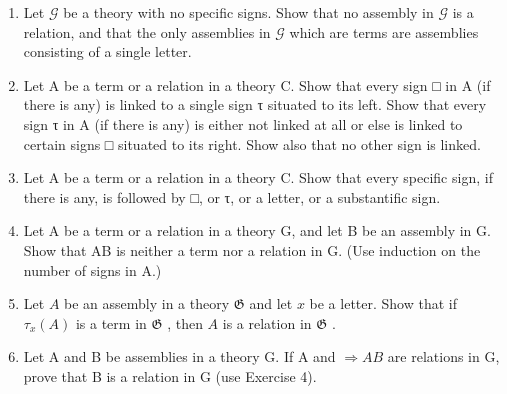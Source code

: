 \exercisegroup

\begin{enumerate}
\def\labelenumi{\arabic{enumi}.}
\item
  Let \(\mathcal{G}\) be a theory with no specific signs. Show that no assembly in \(\mathcal{G}\) is a relation, and that the only assemblies in \(\mathcal{G}\) which are terms are assemblies consisting of a single letter.
\item
  Let A be a term or a relation in a theory C. Show that every sign □ in A (if there is any) is linked to a single sign τ situated to its left. Show that every sign τ in A (if there is any) is either not linked at all or else is linked to certain signs □ situated to its right. Show also that no other sign is linked.
\item
  Let A be a term or a relation in a theory C. Show that every specific sign, if there is any, is followed by □, or τ, or a letter, or a substantific sign.
\item
  Let A be a term or a relation in a theory G, and let B be an assembly in G. Show that AB is neither a term nor a relation in G. (Use induction on the number of signs in A.)
\item
  Let \(A\) be an assembly in a theory \(\mathfrak{G}\) and let \(x\) be a letter. Show that if \(\tau_{x}(A)\) is a term in \(\mathfrak{G}\) , then \(A\) is a relation in \(\mathfrak{G}\) .
\item
  Let A and B be assemblies in a theory G. If A and \(\Longrightarrow AB\) are relations in G, prove that B is a relation in G (use Exercise 4).
\end{enumerate}

